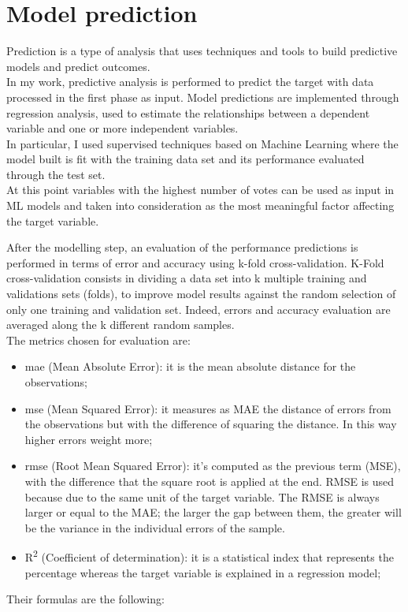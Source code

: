 \section{Model prediction}
Prediction is a type of analysis that uses techniques and tools to build predictive models and predict outcomes. \\
In my work, predictive analysis is performed to predict the target with data processed in the first phase as input.\newline
Model predictions are implemented through regression analysis, used to estimate the relationships between a dependent variable and one or more independent variables.\\
In particular, I used supervised techniques based on Machine Learning where the model built is fit with the training data set and its performance evaluated through the test set. 
\\
At this point variables with the highest number of votes can be used as input in ML models and taken into consideration as the most meaningful factor affecting the target variable.
\par
After the modelling step, an evaluation of the performance predictions is performed in terms of error and accuracy using k-fold cross-validation.\newline
K-Fold cross-validation consists in dividing a data set into k multiple training and validations sets (folds), to improve model results against the random selection of only one training and validation set. Indeed, errors and accuracy evaluation are averaged along the k different random samples.\\
The metrics chosen for evaluation are:
\begin{itemize}
    \item \acrshort{mae} (Mean Absolute Error): it is the mean absolute distance for the observations;
    \item \acrshort{mse} (Mean Squared Error): it measures as MAE the distance of errors from the observations but with the difference of squaring the distance. In this way higher errors weight more;
    \item \acrshort{rmse} (Root Mean Squared Error): it's computed as the previous term (MSE), with the difference that the square root is applied at the end. RMSE is used because due to the same unit of the target variable.
    The RMSE is always larger or equal to the MAE; the larger the gap between them, the greater will be the variance in the individual errors of the sample.
    \item R\textsuperscript{2} (Coefficient of determination): it is a statistical index that represents the percentage whereas the target variable is explained in a regression model;
\end{itemize} 
Their formulas are the following:
